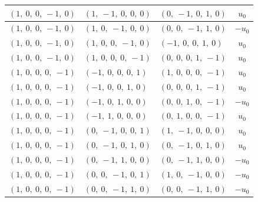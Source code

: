 \documentclass[11pt]{article}
\theoremstyle{definition}
\begin{document}
\begin{longtable}{|l|l|l|c|}
    \hline
    $\left( 1, \  0, \  0, \  -1, \  0\right)$ & $\left( 1, \  -1, \  0, \  0, \  0\right)$ & $\left( 0, \  -1, \  0, \  1, \  0\right)$ & $u_{0}$ \\
    \hline
    $\left( 1, \  0, \  0, \  -1, \  0\right)$ & $\left( 1, \  0, \  -1, \  0, \  0\right)$ & $\left( 0, \  0, \  -1, \  1, \  0\right)$ & $- u_{0}$ \\
    \hline
    $\left( 1, \  0, \  0, \  -1, \  0\right)$ & $\left( 1, \  0, \  0, \  -1, \  0\right)$ & $\left( -1, \  0, \  0, \  1, \  0\right)$ & $u_{0}$ \\
    \hline
    $\left( 1, \  0, \  0, \  -1, \  0\right)$ & $\left( 1, \  0, \  0, \  0, \  -1\right)$ & $\left( 0, \  0, \  0, \  1, \  -1\right)$ & $u_{0}$ \\
    \hline
    $\left( 1, \  0, \  0, \  0, \  -1\right)$ & $\left( -1, \  0, \  0, \  0, \  1\right)$ & $\left( 1, \  0, \  0, \  0, \  -1\right)$ & $u_{0}$ \\
    \hline
    $\left( 1, \  0, \  0, \  0, \  -1\right)$ & $\left( -1, \  0, \  0, \  1, \  0\right)$ & $\left( 0, \  0, \  0, \  1, \  -1\right)$ & $u_{0}$ \\
    \hline
    $\left( 1, \  0, \  0, \  0, \  -1\right)$ & $\left( -1, \  0, \  1, \  0, \  0\right)$ & $\left( 0, \  0, \  1, \  0, \  -1\right)$ & $- u_{0}$ \\
    \hline
    $\left( 1, \  0, \  0, \  0, \  -1\right)$ & $\left( -1, \  1, \  0, \  0, \  0\right)$ & $\left( 0, \  1, \  0, \  0, \  -1\right)$ & $u_{0}$ \\
    \hline
    $\left( 1, \  0, \  0, \  0, \  -1\right)$ & $\left( 0, \  -1, \  0, \  0, \  1\right)$ & $\left( 1, \  -1, \  0, \  0, \  0\right)$ & $u_{0}$ \\
    \hline
    $\left( 1, \  0, \  0, \  0, \  -1\right)$ & $\left( 0, \  -1, \  0, \  1, \  0\right)$ & $\left( 0, \  -1, \  0, \  1, \  0\right)$ & $u_{0}$ \\
    \hline
    $\left( 1, \  0, \  0, \  0, \  -1\right)$ & $\left( 0, \  -1, \  1, \  0, \  0\right)$ & $\left( 0, \  -1, \  1, \  0, \  0\right)$ & $- u_{0}$ \\
    \hline
    $\left( 1, \  0, \  0, \  0, \  -1\right)$ & $\left( 0, \  0, \  -1, \  0, \  1\right)$ & $\left( 1, \  0, \  -1, \  0, \  0\right)$ & $- u_{0}$ \\
    \hline
    $\left( 1, \  0, \  0, \  0, \  -1\right)$ & $\left( 0, \  0, \  -1, \  1, \  0\right)$ & $\left( 0, \  0, \  -1, \  1, \  0\right)$ & $- u_{0}$ \\

\end{longtable}
\end{document}
